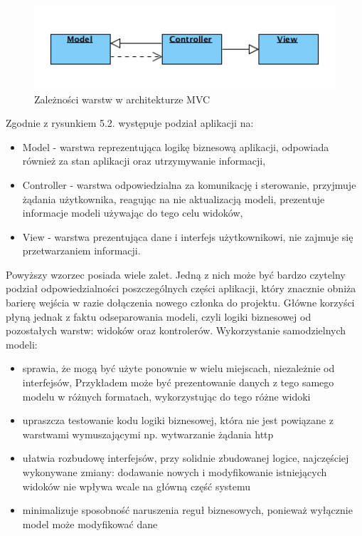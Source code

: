 \begin{figure}[H] 
\centering\includegraphics[width=15cm]{figures/image3}
\caption{Zależności warstw w architekturze MVC}\label{rys:use-case-diagram}
\end{figure}

Zgodnie z rysunkiem 5.2. występuje podział aplikacji na:

\begin{itemize}
\item Model - warstwa reprezentująca logikę biznesową aplikacji, odpowiada również za stan aplikacji oraz utrzymywanie informacji,
\item Controller - warstwa odpowiedzialna za komunikację i sterowanie, przyjmuje żądania użytkownika, reagując na nie aktualizacją modeli, prezentuje informacje modeli używając do tego celu widoków,
\item View - warstwa prezentująca dane i interfejs użytkownikowi, nie zajmuje się przetwarzaniem informacji.
\end{itemize}

Powyższy wzorzec posiada wiele zalet. Jedną z nich może być bardzo czytelny podział odpowiedzialności poszczególnych części aplikacji, który znacznie obniża barierę wejścia w razie dołączenia nowego członka do projektu. Główne korzyści płyną jednak z faktu odseparowania modeli, czyli logiki biznesowej od pozostałych warstw: widoków oraz kontrolerów. Wykorzystanie samodzielnych modeli: 

\begin{itemize}
\item sprawia, że mogą być użyte ponownie w wielu miejscach, niezależnie od interfejsów, Przykładem może być prezentowanie danych z tego samego modelu w różnych formatach, wykorzystując do tego różne widoki
\item upraszcza testowanie kodu logiki biznesowej, która nie jest powiązane z warstwami wymuszającymi np. wytwarzanie żądania http
\item ułatwia rozbudowę interfejsów, przy solidnie zbudowanej logice, najczęściej wykonywane zmiany: dodawanie nowych i modyfikowanie istniejących widoków nie wpływa wcale na główną część systemu
\item minimalizuje sposobność naruszenia reguł biznesowych, ponieważ wyłącznie model może modyfikować dane
\end{itemize}

